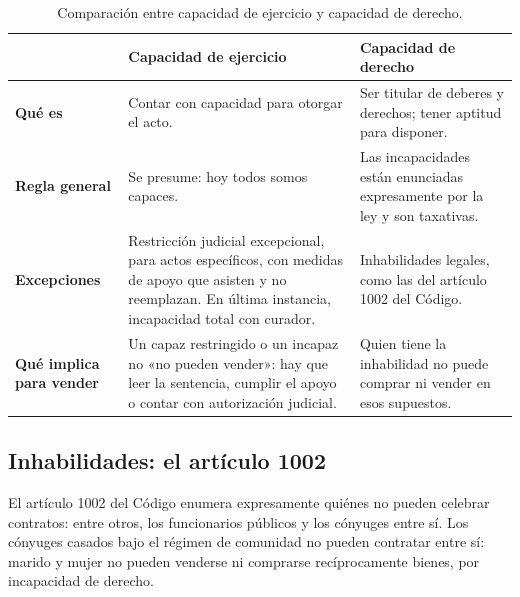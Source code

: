 \documentclass[12pt,oneside]{book}
\begin{document}
\begin{table}[H]
\centering
\small
\begin{tabularx}{\textwidth}{@{}>{\raggedright\arraybackslash}p{}>{\raggedright\arraybackslash}X>{\raggedright\arraybackslash}X@{}}
\toprule
 & \textbf{Capacidad de ejercicio} & \textbf{Capacidad de derecho} \\
\midrule
\textbf{Qué es} & Contar con capacidad para otorgar el acto. & Ser titular de deberes y derechos; tener aptitud para disponer. \\
\textbf{Regla general} & Se presume: hoy todos somos capaces. & Las incapacidades están enunciadas expresamente por la ley y son taxativas. \\
\textbf{Excepciones} & Restricción judicial excepcional, para actos específicos, con medidas de apoyo que asisten y no reemplazan. En última instancia, incapacidad total con curador. & Inhabilidades legales, como las del artículo 1002 del Código. \\
\textbf{Qué implica para vender} & Un capaz restringido o un incapaz no «no pueden vender»: hay que leer la sentencia, cumplir el apoyo o contar con autorización judicial. & Quien tiene la inhabilidad no puede comprar ni vender en esos supuestos. \\
\bottomrule
\end{tabularx}
\caption*{Comparación entre capacidad de ejercicio y capacidad de derecho.}
\end{table}

\subsection{Inhabilidades: el artículo 1002}

El artículo 1002 del Código enumera expresamente quiénes no pueden celebrar contratos: entre otros, los funcionarios públicos y los cónyuges entre sí. Los cónyuges casados bajo el régimen de comunidad no pueden contratar entre sí: marido y mujer no pueden venderse ni comprarse recíprocamente bienes, por incapacidad de derecho.
\end{document}
